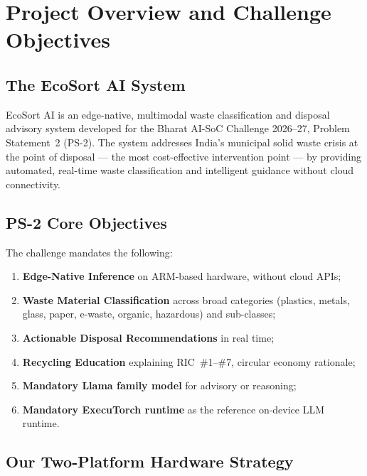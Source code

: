 \documentclass[12pt,a4paper]{article}
\begin{document}
\tableofcontents
\clearpage

\section{Project Overview and Challenge Objectives}

\subsection{The EcoSort AI System}

EcoSort AI is an edge-native, multimodal waste classification and disposal advisory
system developed for the Bharat AI-SoC Challenge 2026--27, Problem Statement~2 (PS-2).
The system addresses India's municipal solid waste crisis at the point of disposal ---
the most cost-effective intervention point --- by providing automated, real-time waste
classification and intelligent guidance without cloud connectivity.

\subsection{PS-2 Core Objectives}

The challenge mandates the following:
\begin{enumerate}[label=\roman*.]
  \item \textbf{Edge-Native Inference} on ARM-based hardware, without cloud APIs;
  \item \textbf{Waste Material Classification} across broad categories
  (plastics, metals, glass, paper, e-waste, organic, hazardous) and sub-classes;
  \item \textbf{Actionable Disposal Recommendations} in real time;
  \item \textbf{Recycling Education} explaining RIC~\#1--\#7, circular economy rationale;
  \item \textbf{Mandatory Llama family model} for advisory or reasoning;
  \item \textbf{Mandatory ExecuTorch runtime} as the reference on-device LLM runtime.
\end{enumerate}

\subsection{Our Two-Platform Hardware Strategy}
\end{document}
